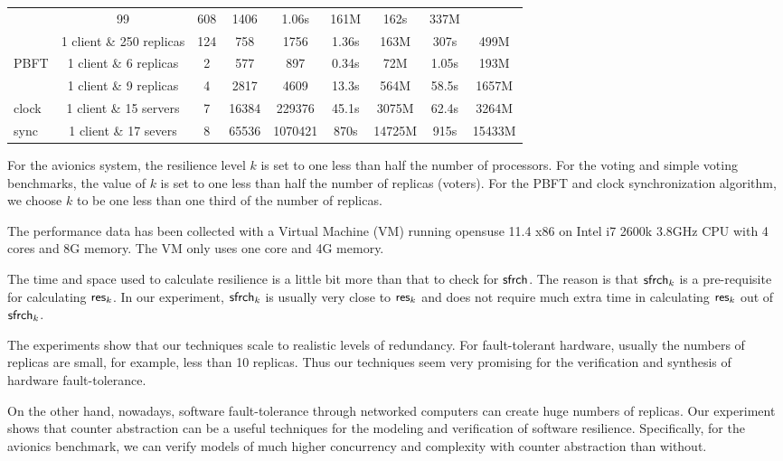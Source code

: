 \begin{table*}[t]
\begin{center}
{\begin{tabular}{l|c|c|c|c||c|c||c|c}
	 & 99 & 608 & 1406 & 1.06s & 161M & 162s & 337M \\ \cline{2-9} 
	 & 1 client \& 250 replicas 
	 & 124 & 758 & 1756 & 1.36s & 163M & 307s & 499M \\ \hline 
PBFT 	 & 1 client \& 6 replicas 
	 & 2 & 577 & 897 & 0.34s & 72M & 1.05s & 193M \\ \cline{2-9} 
	 & 1 client \& 9 replicas 
	 & 4 & 2817 & 4609 & 13.3s & 564M & 58.5s & 1657M \\ \hline 
clock	 & 1 client \& 15 servers  
	 & 7 & 16384 & 229376 & 45.1s & 3075M & 62.4s & 3264M  \\ \cline{2-9} 
sync	 & 1 client \& 17 severs  
	 & 8 & 65536 & 1070421 & 870s & 14725M & 915s & 15433M  \\ \hline 
\end{tabular}
}
\end{center}
\vspace*{-5mm}
\end{table*}
For the avionics system, %
the resilience level $k$ is set to 
one less than half the %
number of processors.  
For the voting and simple voting benchmarks, 
the value of $k$ is set to one less than half the number of 
replicas (voters). 
For the PBFT and clock synchronization algorithm, we choose 
$k$ to be one less than one third of the number of replicas. 

The performance data has been collected with a Virtual Machine (VM) 
running opensuse 11.4 x86 
on Intel i7 2600k 3.8GHz CPU 
with 4 cores and 8G memory. 
The VM only uses one core and 4G memory.  

The time and space used to calculate resilience is a little bit more 
than that to check for $\mathsf{sfrch}$.  
The reason is that $\mathsf{sfrch}_k$ is a pre-requisite for calculating $\mathsf{res}_k$.  
In our experiment, $\mathsf{sfrch}_k$ is usually 
very close to $\mathsf{res}_k$ and does not require much extra time in 
calculating $\mathsf{res}_k$ out of $\mathsf{sfrch}_k$.  

The experiments show that our techniques 
scale to realistic levels of redundancy.  
For fault-tolerant hardware, usually the numbers of replicas are small, 
for example, less than 10 replicas. 
Thus our techniques seem very promising for the 
verification and synthesis\label{reply2.verification.hardware} of hardware fault-tolerance.  

On the other hand, 
nowadays, software fault-tolerance through networked computers can 
create huge numbers of replicas.  
Our experiment shows that counter abstraction can be a useful 
techniques for the modeling and verification of software resilience.  
Specifically, for the avionics benchmark, 
we can verify models of much higher concurrency and complexity with 
counter abstraction than without. 
